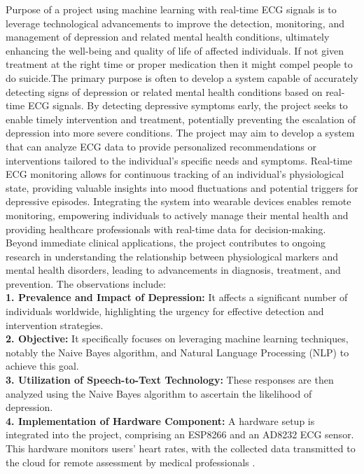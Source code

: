 Purpose of a project using machine learning with real-time ECG signals is to leverage technological advancements to improve the detection, monitoring, and management of depression and related mental health conditions, ultimately enhancing the well-being and quality of life of affected individuals. If not given treatment at the right time or proper medication then it might compel people to do suicide.The primary purpose is often to develop a system capable of accurately detecting signs of depression or related mental health conditions based on real-time ECG signals.
 By detecting depressive symptoms early, the project seeks to enable timely intervention and treatment, potentially preventing the escalation of depression into more severe conditions. The project may aim to develop a system that can analyze ECG data to provide personalized recommendations or interventions tailored to the individual's specific needs and symptoms. Real-time ECG monitoring\cite{serhani2020ecg} allows for continuous tracking of an individual's physiological state, providing valuable insights into mood fluctuations and potential triggers for depressive episodes. Integrating the system into wearable devices enables remote monitoring, empowering individuals to actively manage their mental health and providing healthcare professionals with real-time data for decision-making. Beyond immediate clinical applications, the  project contributes to ongoing research in understanding the relationship between physiological markers and mental health disorders, leading to advancements in diagnosis, treatment, and prevention.
The observations include: 
\\
\textbf{1. Prevalence and Impact of Depression:}
It affects a significant number of individuals worldwide, highlighting the urgency for effective detection and intervention strategies.
\\
\textbf{2. Objective:}
It specifically focuses on leveraging machine learning techniques, notably the Naive Bayes algorithm\cite{berrar2019bayes}, and Natural Language Processing (NLP) to achieve this goal.
\\
\textbf{3. Utilization of Speech-to-Text Technology:}
These responses are then analyzed using the Naive Bayes algorithm to ascertain the likelihood of depression.
\\
\textbf{4. Implementation of Hardware Component:}
A hardware setup is integrated into the project, comprising an ESP8266 and an AD8232 ECG sensor.
This hardware monitors users' heart rates, with the collected data transmitted to the cloud for remote assessment by medical professionals \cite{kayte2015marathi}.
